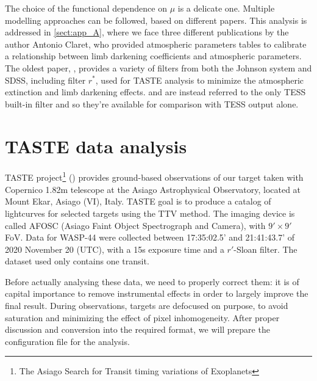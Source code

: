 \documentclass{aa}
\begin{document}
The choice of the functional dependence on
$\mu$ is a delicate one. Multiple modelling approaches can
be followed, based on different papers. This
analysis is addressed in \ref{sect:app_A}, 
where we face three different publications 
by the author Antonio Claret, who provided 
atmospheric parameters tables to calibrate a relationship between limb 
darkening coefficients and atmospheric 
parameters. The oldest paper, \cite{claret2011},
provides a variety of filters from both the Johnson 
system and SDSS, including filter $r^*$, used for TASTE analysis to minimize the atmospheric extinction and limb darkening effects. 
\cite{claret2017} and \cite{claret2018}
are instead referred to the only TESS built-in filter and 
so they're available for comparison with TESS output alone.



\section{TASTE data analysis}

TASTE project\footnote{The Asiago Search for Transit timing variations of Exoplanets} (\cite{Nascimbeni}) provides ground-based observations of our target taken with Copernico 1.82m telescope at the Asiago Astrophysical Observatory, located at Mount Ekar, Asiago (VI), Italy. TASTE goal is to produce a catalog of lightcurves for selected targets using the TTV method. The imaging device is called AFOSC (Asiago Faint Object Spectrograph and Camera), with $9'\times9'$ FoV. Data for WASP-44 were collected between 17:35:02.5' and 21:41:43.7' of 2020 November 20 (UTC), with a 15s exposure time and a $r'$-Sloan filter. The dataset used only contains one transit.

Before actually analysing these data, we need to properly correct them: it is of capital importance to remove instrumental effects in order to largely improve the final result. During observations, targets are defocused on purpose, to avoid saturation and minimizing the effect of pixel inhomogeneity. After proper discussion and conversion into the required format, we will prepare the configuration file for the analysis. 
\end{document}
